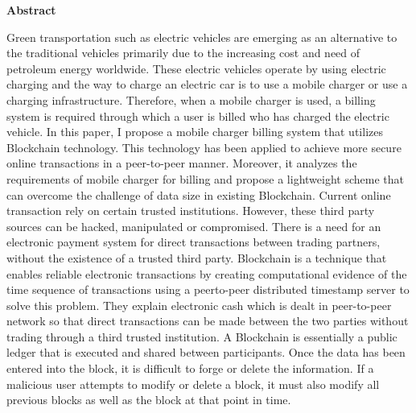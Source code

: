 
\begin{titlepage}
\begin{center}
\textbf{\LARGE{Abstract}}\\[1cm]
\end{center}
\normalsize
\par Green transportation such as electric vehicles are emerging as an alternative to the traditional vehicles primarily due to the increasing cost and need of petroleum energy worldwide. These electric vehicles operate by using electric charging and the way to charge an electric car is to use a mobile charger or use a charging infrastructure. Therefore, when a mobile charger is used, a billing system is required through which a user is billed who has charged the electric vehicle. In this paper, I propose a mobile charger billing system that utilizes Blockchain technology. This technology has been applied to achieve more secure online transactions in a peer-to-peer manner. Moreover, it analyzes the requirements of mobile charger for billing and propose a lightweight scheme that can overcome the challenge of data size in existing Blockchain. Current online transaction rely on certain trusted institutions. However, these third party sources can be hacked, manipulated or compromised. There is a need for an electronic payment system for direct transactions between trading partners, without the existence of a trusted third
party. Blockchain is a technique that enables reliable electronic transactions by creating computational evidence of the time sequence of transactions using a peerto-peer distributed timestamp server to solve this problem. They explain electronic cash which is dealt in peer-to-peer network so that direct transactions can be made
between the two parties without trading through a third trusted institution. A Blockchain is essentially a public ledger that is executed and shared between participants. Once the data has been entered into the block, it is difficult to forge or delete the information. If a malicious user attempts to modify or delete a block, it must also modify all previous blocks as well as the block at that point in time.
\end{titlepage}
